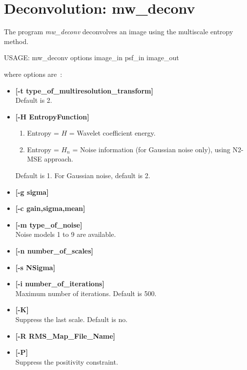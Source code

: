 \section{Deconvolution: mw\_deconv}
The program {\em mw\_deconv} deconvolves  an image using the 
multiscale entropy method. 
{\bf 
\begin{center}
 USAGE: mw\_deconv options image\_in psf\_in image\_out
\end{center}}
where options are~:
\begin{itemize}
\baselineskip=0.4truecm
\itemsep=0.1truecm
\item {\bf [-t type\_of\_multiresolution\_transform]} \\
Default is 2.
\item {\bf [-H EntropyFunction]} 
\begin{enumerate}
\baselineskip=0.4truecm
\itemsep=0.1truecm
\item Entropy = $H$ = Wavelet coefficient energy.
\item Entropy = $H_n$ = Noise information (for Gaussian noise only), using 
N2-MSE approach.
\end{enumerate}
Default is 1. For Gaussian noise, default is 2.
\item {\bf [-g sigma]} 
\item {\bf [-c gain,sigma,mean]}
\item {\bf [-m type\_of\_noise]} \\
Noise models 1 to 9 are available.
\item {\bf [-n number\_of\_scales]} 
\item {\bf [-s NSigma]} 
\item {\bf [-i number\_of\_iterations]} \\
 Maximum number of iterations. Default is 500.
\item {\bf [-K]}  \\
Suppress the last scale. Default is no. 
\item {\bf [-R RMS\_Map\_File\_Name]} \\
\item {\bf [-P]} \\
Suppress the positivity constraint.


\end{itemize}
